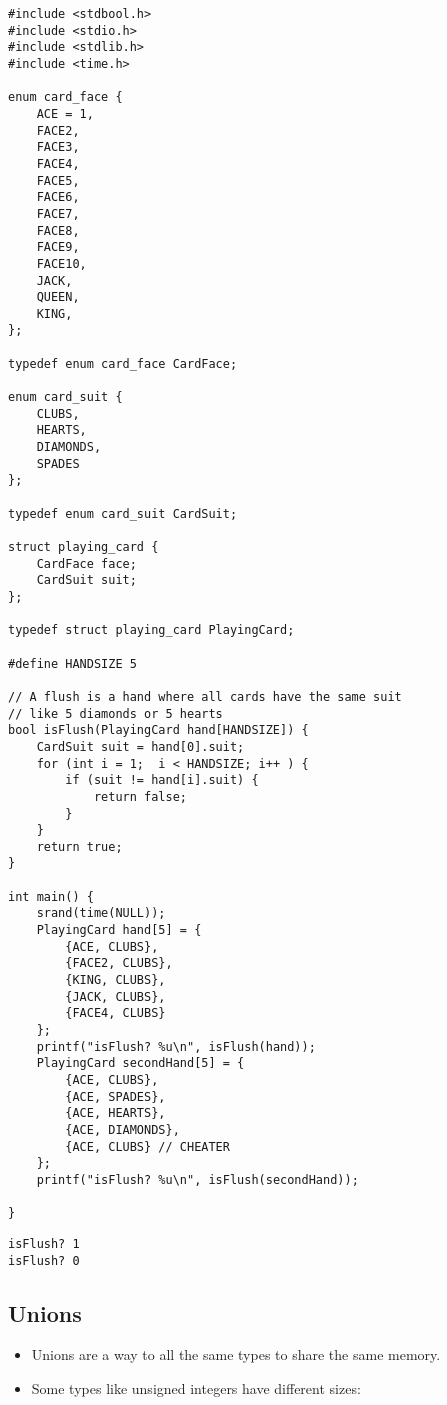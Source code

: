 \documentclass[11pt]{article}
\begin{document}
\begin{verbatim}
#include <stdbool.h> 
#include <stdio.h>
#include <stdlib.h>
#include <time.h>

enum card_face {
    ACE = 1,
    FACE2,
    FACE3,
    FACE4,
    FACE5,
    FACE6,
    FACE7,
    FACE8,
    FACE9,
    FACE10,
    JACK,
    QUEEN,
    KING,
};

typedef enum card_face CardFace;

enum card_suit {
    CLUBS,
    HEARTS,
    DIAMONDS,
    SPADES
};

typedef enum card_suit CardSuit;

struct playing_card {
    CardFace face;
    CardSuit suit;
};

typedef struct playing_card PlayingCard;

#define HANDSIZE 5

// A flush is a hand where all cards have the same suit
// like 5 diamonds or 5 hearts
bool isFlush(PlayingCard hand[HANDSIZE]) {
    CardSuit suit = hand[0].suit;
    for (int i = 1;  i < HANDSIZE; i++ ) {
        if (suit != hand[i].suit) {
            return false;
        }
    }
    return true;
}

int main() {
    srand(time(NULL));
    PlayingCard hand[5] = {
        {ACE, CLUBS},
        {FACE2, CLUBS},
        {KING, CLUBS},
        {JACK, CLUBS},
        {FACE4, CLUBS}
    };
    printf("isFlush? %u\n", isFlush(hand));
    PlayingCard secondHand[5] = {
        {ACE, CLUBS},
        {ACE, SPADES},
        {ACE, HEARTS},
        {ACE, DIAMONDS},
        {ACE, CLUBS} // CHEATER
    };
    printf("isFlush? %u\n", isFlush(secondHand));

}
\end{verbatim}

\begin{verbatim}
isFlush? 1
isFlush? 0
\end{verbatim}



\subsection{Unions}
\label{sec:org40b1862}

\begin{itemize}
\item Unions are a way to all the same types to share the same memory.
\item Some types like unsigned integers have different sizes:
\end{itemize}
\end{document}
